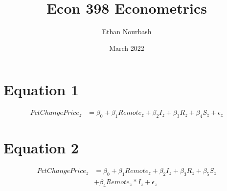 \documentclass{article}
\title{Econ 398 Econometrics}
\author{Ethan Nourbash}
\date{March 2022}
\begin{document}
\maketitle

\section{Equation 1}
\begin{equation}
    \begin{aligned}
    PctChangePrice_z & = \beta_0 + \beta_1 Remote_z + \beta_2 I_z + \beta_3 R_z + \beta_4 S_z + \epsilon_z
    \end{aligned}
\end{equation}
\section{Equation 2}
\begin{equation}
    \begin{aligned}
    PctChangePrice_z & = \beta_0 + \beta_1 Remote_z + \beta_2 I_z + \beta_3 R_z + \beta_5 S_z\\
			    &  + \beta_4 Remote_z*I_z   + \epsilon_z
    \end{aligned}
\end{equation}
\end{document}
